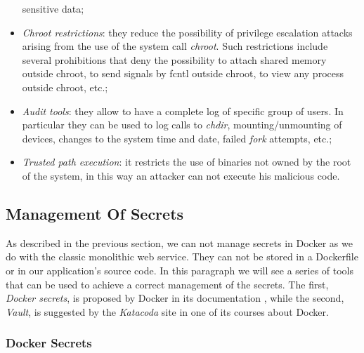 \documentclass[a4paper,12pt]{article}
\begin{document}
\begin{itemize}
  sensitive data;
  \item \textit{Chroot restrictions}: they reduce the possibility of privilege escalation
  attacks arising from the use of the system call \textit{chroot}. Such
  restrictions include several prohibitions that deny the possibility to
  attach shared memory outside chroot, to send signals by fcntl outside chroot,
  to view any process outside chroot, etc.;
  \item \textit{Audit tools}: they allow to have a complete log of specific group of
  users. In particular they can be used to log calls to \textit{chdir},
  mounting/unmounting of devices, changes to the system time and date, failed
  \textit{fork} attempts, etc.;
  \item \textit{Trusted path execution}: it restricts the use of binaries not owned by
  the root of the system, in this way an attacker can not execute his malicious
  code.
\end{itemize}

\subsection{Management Of Secrets}

As described in the previous section, we can not manage secrets in Docker as we
do with the classic monolithic web service. They can not be stored in a
Dockerfile or in our application's source code. In this paragraph we will see a
series of tools that can be used to achieve a correct management of the secrets.
The first, \textit{Docker secrets}, is proposed by Docker in its documentation
\cite{docker_secrets}, while the second, \textit{Vault}, is suggested by the
\textit{Katacoda} \cite{katacoda_vault} site in one of its courses about Docker.

\subsubsection{Docker Secrets}
\end{document}
